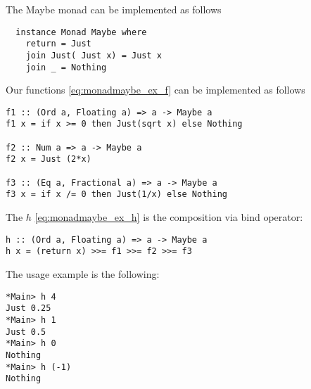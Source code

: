 \begin{example}
\label{ex:maybe_monad_haskell}
The Maybe monad can be implemented as follows
\begin{verbatim}
  instance Monad Maybe where
    return = Just
    join Just( Just x) = Just x
    join _ = Nothing
\end{verbatim} 

Our functions \eqref{eq:monadmaybe_ex_f} can be implemented as follows
\begin{verbatim}
f1 :: (Ord a, Floating a) => a -> Maybe a
f1 x = if x >= 0 then Just(sqrt x) else Nothing 

f2 :: Num a => a -> Maybe a
f2 x = Just (2*x)

f3 :: (Eq a, Fractional a) => a -> Maybe a
f3 x = if x /= 0 then Just(1/x) else Nothing
\end{verbatim}

The $h$ \eqref{eq:monadmaybe_ex_h} is the composition via bind
operator:
\begin{verbatim}
h :: (Ord a, Floating a) => a -> Maybe a
h x = (return x) >>= f1 >>= f2 >>= f3
\end{verbatim}

The usage example is the following:
\begin{verbatim}
*Main> h 4
Just 0.25
*Main> h 1
Just 0.5
*Main> h 0
Nothing
*Main> h (-1)
Nothing
\end{verbatim}

\end{example}


